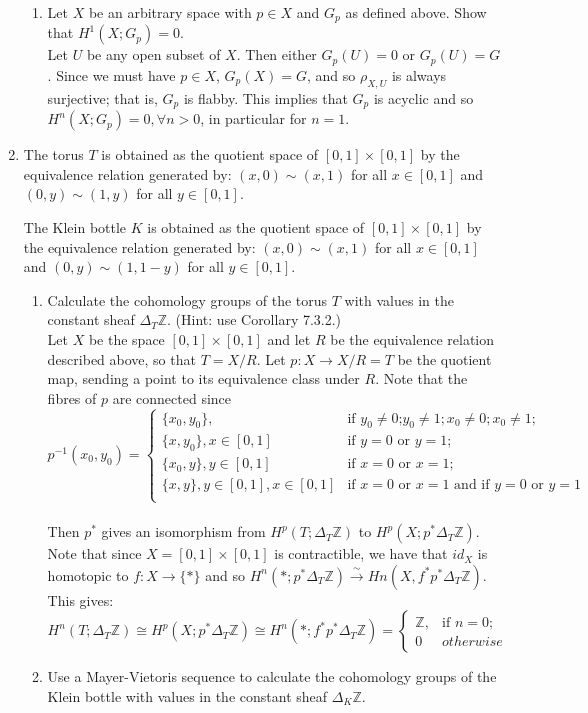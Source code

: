 \documentclass{article}
\newcommand{\zed}{\mathbb Z}
\begin{document}
\begin{enumerate}
\begin{enumerate}
\item Let $X$ be an arbitrary space with $p\in X$ and $G_p$ as defined above.
Show that $H^1(X;G_p)=0$.\\

Let $U$ be any open subset of $X$. Then either $G_p(U)=0$ or $G_p(U)=G$. Since we must have $p \in X$, $G_p(X)=G$, and so $\rho_{X,U}$ is always surjective; that is, $G_p$ is flabby.  This implies that $G_p$ is acyclic and so $H^n(X;G_p)=0, \forall n >0$, in particular for $n=1$.
\end{enumerate}
\newpage
\item
The torus $T$ is obtained as the quotient space of $[0,1]\times[0,1]$ by the equivalence relation generated by: 
$(x,0)\sim (x,1)$ for all $x\in [0,1]$ and $(0,y)\sim(1,y)$ for all $y\in [0,1]$.

The Klein bottle $K$ is obtained as the quotient space of $[0,1]\times[0,1]$ by the equivalence relation generated by: 
$(x,0)\sim (x,1)$ for all $x\in [0,1]$ and $(0,y)\sim(1,1-y)$ for all $y\in [0,1]$.
\begin{enumerate}
\item
Calculate the cohomology groups of the torus $T$ with values in the constant sheaf $\Delta_T\zed$. (Hint: use Corollary 7.3.2.)\\


Let $X$ be the space $[0,1]\times [0,1]$ and let $R$ be the equivalence relation described above, so that $T = X/R$. Let $p: X \rightarrow X/R=T$ be the quotient map, sending a point to its equivalence class under $R$. Note that the fibres of $p$ are connected since 
\[p^{-1}(x_0,y_0)= 
\begin{cases}
\{x_0,y_0\}, & \text{if } y_0 \neq 0 \text{;} y_0 \neq 1; x_0 \neq 0; x_0 \neq 1;\\
\{x,y_0\}, x \in [0,1] & \text{if } y = 0 \text{ or } y = 1;\\
\{x_0,y\}, y \in [0,1] & \text{if } x = 0 \text{ or } x = 1;\\
\{x,y\}, y \in [0,1], x \in [0,1] & \text{if } x = 0 \text{ or } x = 1 \text{ and } \text{if } y = 0 \text{ or } y = 1\\
\end{cases}\] \\


Then $p^*$ gives an isomorphism from $H^p(T; \Delta_T\mathbb{Z})$ to $H^p(X; p^*\Delta_T\mathbb{Z})$. Note that  since $X = [0,1] \times [0,1]$ is contractible, we have that $id_X$ is homotopic  to $f: X \rightarrow \{*\}$ and so $H^n({*};p^*\Delta_T\mathbb{Z}) \xrightarrow{\sim} Hn(X,f^*p^*\Delta_T\mathbb{Z})$. This gives: 
\[
H^n(T; \Delta_T\mathbb{Z}) \cong H^p(X; p^*\Delta_T\mathbb{Z}) \cong H^n({*};f^*p^*\Delta_T\mathbb{Z}) = \begin{cases}
\mathbb{Z}, & \text{if } n=0;\\
0 & otherwise  
\end{cases}
\]
\item Use a Mayer-Vietoris sequence to calculate the cohomology groups of the Klein bottle with values in the constant sheaf $\Delta_K\zed$. 


\end{enumerate}
\end{enumerate}
\end{document}
